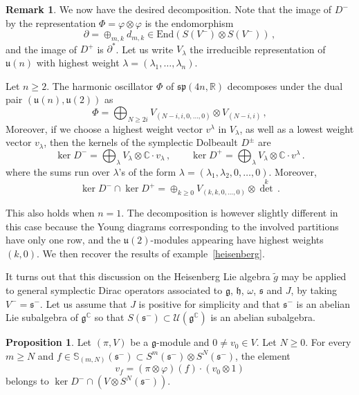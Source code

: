 \documentclass{amsart}[draft,11pt]
\numberwithin{equation}{section}
\theoremstyle{definition}
\newtheorem{proposition}[theorem]{Proposition}
\newtheorem{remark}[theorem]{Remark}
\begin{document}
\begin{remark}
We now have the desired decomposition.
Note that the image of $D^-$ by the representation $\Phi=\varphi\otimes\varphi$ is the endomorphism 
$$\partial=\oplus_{m,k}d_{m,k}\in \text{End}(S(V^-)\otimes S(V^-))\,,$$
and
the image of $D^+$ is $\partial^*$.
Let us write $V_{\lambda}$ the irreducible representation of $\mathfrak{u}(n)$ with highest weight $\lambda=(\lambda_1,\ldots,\lambda_n)$.

Let $n\geq 2$. The harmonic oscillator $\Phi$ of $\mathfrak{sp}(4n,\mathbb{R})$ 
decomposes under the dual pair $(\mathfrak u(n),\mathfrak{u}(2))$ as
$$ \Phi = \bigoplus_{N \ge 2i} V_{(N-i,i,0,\ldots,0)}\otimes  V_{(N-i,i)}\,,$$
Moreover, if we choose a highest weight vector $v^\lambda$ in $V_\lambda$, as well as a lowest weight vector $v_\lambda$, then the kernels of the symplectic Dolbeault $D^\pm$ 
are
$$
\ker D^- = \bigoplus_\lambda V_\lambda\otimes \mathbb C\cdot v_\lambda \,,\qquad
\ker D^+ = \bigoplus_\lambda V_\lambda\otimes \mathbb C\cdot v^\lambda\,.
$$
where the sums run over $\lambda$'s of the form
$\lambda=(\lambda_1,\lambda_2,0,\ldots,0)$.
Moreover, 
$$\ker D^- \cap \ker D^+=\oplus_{k \ge 0} V_{(k,k,0,\ldots,0)} \otimes {\det}^k\,.$$

This also holds when $n=1$.
The decomposition is however slightly different in this case because
the Young diagrams corresponding to the involved partitions have only one row, and the $\mathfrak{u}(2)$-modules appearing have highest weights
$(k,0)$. We then recover the results of example~\ref{heisenberg}.
\end{remark} 

It turns out that this discussion on the Heisenberg Lie algebra $\tilde{g}$ may be applied to general symplectic Dirac operators associated to $\mathfrak g$, $\mathfrak h$, $\omega$, ${\mathfrak s}$ and $J$, by taking $V^-=\mathfrak s^-$. Let us assume that $J$ is positive for simplicity and that
$\mathfrak s^-$ is an abelian Lie subalgebra 
of $\mathfrak g^{\mathbb C}$ so that 
$S(\mathfrak{s}^-) \subset \mathcal U(\mathfrak g^{\mathbb C})$ is an abelian subalgebra. 

\begin{proposition}\label{dolbeault-kernel}
Let $(\pi,V)$ be a $\mathfrak g$-module and $0\neq v_0\in V$. Let $N\ge 0$. For every $m\ge N$ and $f\in \mathbb S_{(m,N)}(\mathfrak s^-)\subset S^m(\mathfrak s^-)\otimes S^N(\mathfrak s^-)$, the element
\[
\label{vf}
v_f=(\pi\otimes \varphi)(f)\cdot (v_0\otimes 1)
\]
belongs to $\ker D^-\cap (V\otimes S^N(\mathfrak s^-))$. 
\end{proposition}
\end{document}
